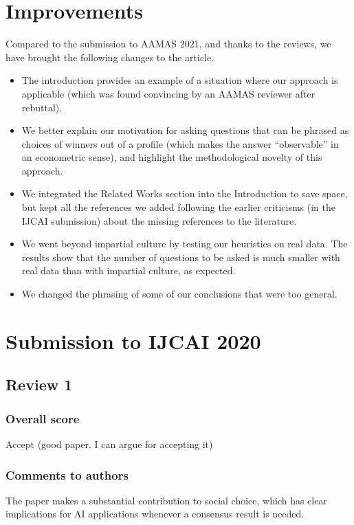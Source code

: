 \documentclass[version=3.21, pagesize, twoside=off, bibliography=totoc, DIV=calc, fontsize=12pt, a4paper]{scrartcl}
\begin{document}
\section{Improvements}
Compared to the submission to AAMAS 2021, and thanks to the reviews, we have brought the following changes to the article.

\begin{itemize}
	\item The introduction provides an example of a situation where our approach is applicable (which was found convincing by an AAMAS reviewer after rebuttal).
	\item We better explain our motivation for asking questions that can be phrased as choices of winners out of a profile (which makes the answer “observable” in an econometric sense), and highlight the methodological novelty of this approach.
	\item We integrated the Related Works section into the Introduction to save space, but kept all the references we added following the earlier criticisms (in the IJCAI submission) about the missing references to the literature.
	\item We went beyond impartial culture by testing our heuristics on real data. The results show that the number of questions to be asked is much smaller with real data than with impartial culture, as expected.
	\item We changed the phrasing of some of our conclusions that were too general.
\end{itemize}

\section{Submission to IJCAI 2020} 
\label{sec:reviews-ijcai}
\subsection{Review 1}
\subsubsection*{Overall score}
Accept (good paper. I can argue for accepting it)
\subsubsection*{Comments to authors}
The paper makes a substantial contribution to social choice, which has clear implications for AI applications whenever a consensus result is needed.
\end{document}
